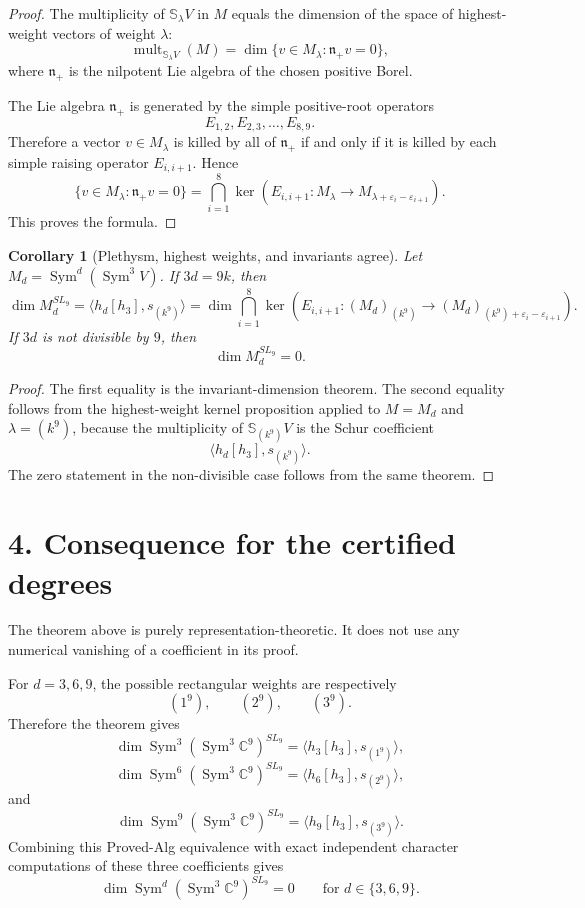 \documentclass[11pt]{article}
\newtheorem{corollary}{Corollary}
\newcommand{\C}{\mathbb C}
\newcommand{\Sym}{\operatorname{Sym}}
\newcommand{\Schur}{\mathbb S}
\begin{document}
\begin{proof}
The multiplicity of \(\Schur_\lambda V\) in \(M\) equals the dimension of the
space of highest-weight vectors of weight \(\lambda\):
\[
    \operatorname{mult}_{\Schur_\lambda V}(M)
    =
    \dim\{v\in M_\lambda:\mathfrak n_+v=0\},
\]
where \(\mathfrak n_+\) is the nilpotent Lie algebra of the chosen positive
Borel.

The Lie algebra \(\mathfrak n_+\) is generated by the simple positive-root
operators
\[
    E_{1,2},E_{2,3},\ldots,E_{8,9}.
\]
Therefore a vector \(v\in M_\lambda\) is killed by all of \(\mathfrak n_+\) if
and only if it is killed by each simple raising operator \(E_{i,i+1}\). Hence
\[
    \{v\in M_\lambda:\mathfrak n_+v=0\}
    =
    \bigcap_{i=1}^{8}
    \ker\left(
        E_{i,i+1}:M_\lambda\to
        M_{\lambda+\varepsilon_i-\varepsilon_{i+1}}
    \right).
\]
This proves the formula.
\end{proof}

\begin{corollary}[Plethysm, highest weights, and invariants agree]
Let \(M_d=\Sym^d(\Sym^3V)\). If \(3d=9k\), then
\[
    \dim M_d^{SL_9}
    =
    \big\langle h_d[h_3],s_{(k^9)}\big\rangle
    =
    \dim
    \bigcap_{i=1}^{8}
    \ker\left(
        E_{i,i+1}:(M_d)_{(k^9)}
        \to
        (M_d)_{(k^9)+\varepsilon_i-\varepsilon_{i+1}}
    \right).
\]
If \(3d\) is not divisible by \(9\), then
\[
    \dim M_d^{SL_9}=0.
\]
\end{corollary}

\begin{proof}
The first equality is the invariant-dimension theorem. The second equality
follows from the highest-weight kernel proposition applied to
\(M=M_d\) and \(\lambda=(k^9)\), because the multiplicity of
\(\Schur_{(k^9)}V\) is the Schur coefficient
\[
    \big\langle h_d[h_3],s_{(k^9)}\big\rangle.
\]
The zero statement in the non-divisible case follows from the same theorem.
\end{proof}

\section*{4. Consequence for the certified degrees}

The theorem above is purely representation-theoretic. It does not use any
numerical vanishing of a coefficient in its proof.

For \(d=3,6,9\), the possible rectangular weights are respectively
\[
    (1^9),\qquad (2^9),\qquad (3^9).
\]
Therefore the theorem gives
\[
    \dim \Sym^3(\Sym^3\C^9)^{SL_9}
    =
    \big\langle h_3[h_3],s_{(1^9)}\big\rangle,
\]
\[
    \dim \Sym^6(\Sym^3\C^9)^{SL_9}
    =
    \big\langle h_6[h_3],s_{(2^9)}\big\rangle,
\]
and
\[
    \dim \Sym^9(\Sym^3\C^9)^{SL_9}
    =
    \big\langle h_9[h_3],s_{(3^9)}\big\rangle.
\]
Combining this Proved-Alg equivalence with exact independent character
computations of these three coefficients gives
\[
    \dim \Sym^d(\Sym^3\C^9)^{SL_9}=0
    \qquad
    \text{for }d\in\{3,6,9\}.
\]
\end{document}
